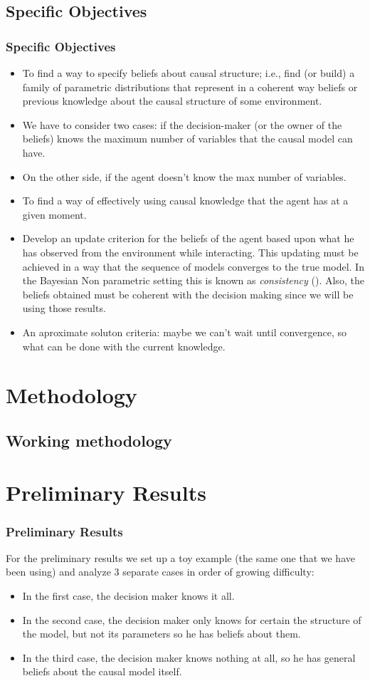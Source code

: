 \documentclass{beamer}
\theoremstyle{plain}
\begin{document}
	\subsection{Specific Objectives}
	\begin{frame}[allowframebreaks]
	\frametitle{Specific Objectives}
	\begin{itemize}
\item To find a way to specify beliefs about causal structure; i.e., find (or build) a family of parametric distributions that represent in a coherent way beliefs or previous knowledge about the causal structure of some environment.
\item  We have to consider two cases: if the decision-maker (or the owner of the beliefs) knows the maximum number of variables that the causal model can have.
\item On the other side, if the agent doesn't know the max number of variables.
\item To find a way of effectively using causal knowledge that the agent has at a given moment.
\item Develop an update criterion for the beliefs of the agent based upon what he has observed from the environment while interacting. This updating must be achieved in a way that the sequence of models converges to the true model. In the Bayesian Non parametric setting this is known as \textit{consistency} (\cite{ghosal2017fundamentals}). Also, the beliefs obtained must be coherent with the decision making since we will be using those results. 
\item An aproximate soluton criteria: maybe we can't wait until convergence, so what can be done with the current knowledge.
\end{itemize}
	\end{frame}
\section{Methodology}

	\subsection{Working methodology}
\section{Preliminary Results}
\begin{frame}
\frametitle{Preliminary Results}
For the preliminary results we set up a toy example (the same one that we have been using) and analyze 3 separate cases in order of growing difficulty:
\begin{itemize}
\item In the first case, the decision maker knows it all.
\item In the second case, the decision maker only knows for certain the structure of the model, but not its parameters so he has beliefs about them.
\item In the third case, the decision maker knows nothing at all, so he has general beliefs about the causal model itself.
\end{itemize}
\end{frame}
\end{document}
